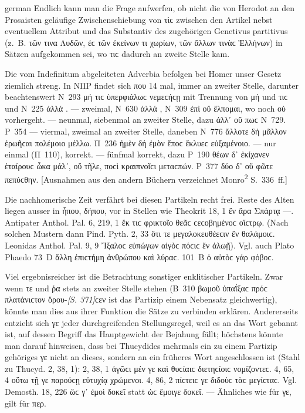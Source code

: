 \begin{otherlanguage*}{german}
Endlich kann man die Frage aufwerfen, ob nicht die von Herodot an den Prosaisten geläufige Zwischenschiebung von τὶϲ zwischen den Artikel nebst eventuellem Attribut und
das Substantiv des zugehörigen Genetivus partitivus (z.~B. τῶν τινα Λυδῶν, ἐϲ τῶν ἐκείνων τι χωρίων, τῶν ἄλλων τινὰϲ Ἑλλήνων) in Sätzen aufgekommen sei, wo τιϲ dadurch an zweite Stelle kam.

Die vom Indefinitum abgeleiteten Adverbia befolgen bei Homer unser Gesetz ziemlich streng. In ΝΠΡ findet sich που 14 mal, immer an zweiter Stelle, darunter beachtenswert Ν~293 μή  τιϲ ὑπερφιάλωϲ νεμεϲήϲῃ mit Trennung von μή und τιϲ und Ν~225 ἀλλά . —  zweimal, Ν~630 ἀλλά , Ν~309 ἐπὶ οὔ  ἔλπομαι, wo noch οὐ vorhergeht. —  neunmal, siebenmal an zweiter Stelle, dazu ἀλλ᾽ οὔ πωϲ Ν~729. Ρ~354 —  viermal, zweimal an zweiter Stelle, daneben Ν~776 ἄλλοτε δή  μᾶλλον ἐρωῆϲαι πολέμοιο μέλλω. Π~236 ἠμὲν δή  ἐμὸν ἔποϲ ἔκλυεϲ εὐξαμένοιο. —  nur einmal (Π~110), korrekt. —  fünfmal korrekt, dazu Ρ~190 θέων δ᾽ ἐκίχανεν ἑταίρουϲ ὦκα μάλ᾽, οὔ  τῆλε, ποϲὶ κραιπνοῖϲι μεταϲπών. Ρ~377 δύο δ᾽ οὔ  φῶτε πεπύϲθην. [Ausnahmen aus den andern Büchern verzeichnet Monro\textsuperscript{2} S.~336~ff.]

Die nachhomerische Zeit verfährt bei diesen Partikeln recht frei. Reste des Alten liegen ausser in ἦπου, δήπου, vor in Stellen wie Theokrit 18, 1 ἔν  ἄρα Σπάρτᾳ —. Antipater Anthol. Pal. 6, 219, 1 ἔκ  τιϲ φρικτοῖο θεᾶϲ ϲεϲοβημένοϲ οἴϲτρῳ. (Nach solchen Mustern dann Pind. Pyth. 2, 33 ὅτι τε μεγαλοκευθέεϲιν ἔν  θαλάμοιϲ. Leonidas Anthol. Pal. 9, 9 Ἴξαλοϲ εὐπώγων αἰγὸϲ πόϲιϲ ἔν  ἁλωῇ). Vgl. auch Plato Phaedo 73~D ἄλλη  ἐπιϲτήμη ἀνθρώπου καὶ λύραϲ. 101~Β ὁ αὐτὸϲ γάρ  φόβοϲ.

Viel ergebnisreicher ist die Betrachtung sonstiger enklitischer Partikeln. Zwar wenn τε und ῥα stets an zweiter Stelle stehen (Β~310 βωμοῦ ὑπαΐξαϲ πρόϲ  πλατάνιϲτον ὄρου-\hypertarget{p371}{\emph{[S. 371]}}\label{p371}ϲεν ist das Partizip einem Nebensatz gleichwertig), könnte man dies aus ihrer Funktion die Sätze zu verbinden erklären. Andererseits entzieht sich γε jeder durchgreifenden Stellungsregel, weil es an das Wort gebannt ist, auf dessen Begriff das Hauptgewicht der Bejahung fällt; höchstens könnte man darauf hinweisen, dass bei Thucydides mehrmals ein zu einem Partizip gehöriges γε nicht an dieses, sondern an ein früheres Wort angeschlossen ist (Stahl zu Thucyd. 2, 38, 1): 2, 38, 1 ἀγῶϲι μέν γε καὶ θυϲίαιϲ διετηϲίοιϲ νομίζοντεϲ. 4, 65, 4 οὕτω τῇ γε παρούϲῃ εὐτυχίᾳ χρώμενοι. 4, 86, 2 πίϲτειϲ γε διδοὺϲ τὰϲ μεγίϲταϲ. Vgl. Demosth. 18, 226 ὥϲ γ᾽ ἐμοὶ δοκεῖ statt ὡϲ ἔμοιγε δοκεῖ. — Ähnliches wie für γε, gilt für περ.


\end{otherlanguage*}

